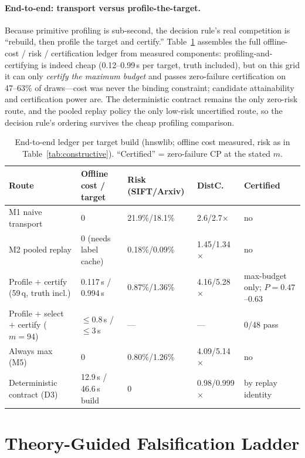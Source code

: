 \documentclass{article}
\begin{document}
\paragraph{End-to-end: transport versus profile-the-target.}
Because primitive profiling is sub-second, the decision rule's real competition is ``rebuild, then profile
the target and certify.'' Table~\ref{tab:e2e} assembles the full offline-cost / risk / certification
ledger from measured components: profiling-and-certifying is indeed cheap (0.12--0.99\,s per target,
truth included), but on this grid it can only \emph{certify the maximum budget} and passes zero-failure
certification on 47--63\% of draws---cost was never the binding constraint; candidate attainability and
certification power are. The deterministic contract remains the only zero-risk route, and the pooled
replay policy the only low-risk uncertified route, so the decision rule's ordering survives the cheap
profiling comparison.

\begin{table}[t]
\centering
\caption{End-to-end ledger per target build (hnswlib; offline cost measured, risk as in
Table~\ref{tab:constructive}). ``Certified'' = zero-failure CP at the stated $m$.}
\label{tab:e2e}
\footnotesize
\setlength{\tabcolsep}{3pt}
\begin{tabular}{p{3.1cm}p{2.6cm}p{2.6cm}p{1.4cm}p{2.4cm}}
\toprule
Route & Offline cost / target & Risk (SIFT/Arxiv) & DistC. & Certified \\
\midrule
M1 naive transport & 0 & 21.9\%/18.1\% & 2.6/2.7$\times$ & no \\
M2 pooled replay & 0 (needs label cache) & 0.18\%/0.09\% & 1.45/1.34$\times$ & no \\
Profile $+$ certify (59\,q, truth incl.) & 0.117\,s / 0.994\,s & 0.87\%/1.36\% & 4.16/5.28$\times$ & max-budget only; $P{=}0.47$--$0.63$ \\
Profile $+$ select $+$ certify ($m{=}94$) & $\le$0.8\,s / $\le$3\,s & --- & --- & 0/48 pass \\
Always max (M5) & 0 & 0.80\%/1.26\% & 4.09/5.14$\times$ & no \\
Deterministic contract (D3) & 12.9\,s / 46.6\,s build & 0 & 0.98/0.999$\times$ & by replay identity \\
\bottomrule
\end{tabular}
\end{table}

\section{Theory-Guided Falsification Ladder}
\label{sec:ladder}
\end{document}
